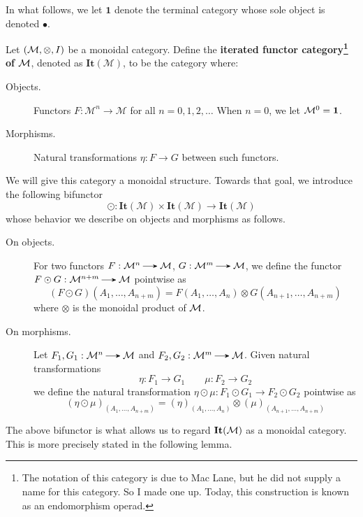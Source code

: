 In what follows, we let $\textbf{1}$ denote the terminal category 
whose sole object is denoted $\bullet$.
\begin{definition}
    Let $(\mathcal{M}, \otimes, I)$ be a monoidal category. 
    Define the \textbf{iterated functor category\footnote{The notation of this category 
    is due to Mac Lane, but he did not supply a name for this category.
    So I made one up. Today, this construction is known as an endomorphism 
    operad.} of $\mathcal{M}$}, denoted as
    $\textbf{It}(\mathcal{M})$, to be the category where:
    \begin{description}
        \item[Objects.] Functors $F: \mathcal{M}^n \to \mathcal{M}$ for all $n = 0, 1, 2, \dots$
        When $n = 0$, we let $\mathcal{M}^0 = \textbf{1}$.
        \item[Morphisms.] Natural transformations $\eta: F \to G$ between such functors.
    \end{description}
\end{definition}

We will give this category a monoidal structure.
Towards that goal, we introduce the following bifunctor
\[
    \odot : \textbf{It}(\mathcal{M})\times \textbf{It}(\mathcal{M}) \to 
    \textbf{It}(\mathcal{M})
\]
whose behavior we describe on objects and morphisms as follows. 
\begin{description}
    \item[On objects.] For two functors $F: \mm^n \to \mm$, $G: \mm^m \to \mm$, 
    we define the functor $F \odot G: \mm^{n+m} \to \mm$ pointwise as 
    \[
        (F \odot G)(A_1, \dots, A_{n+m})
        = 
        F(A_1, \dots, A_n) \otimes G(A_{n+1}, \dots, A_{n+m})
    \]
    where $\otimes$ is the monoidal product of $\mathcal{M}$.
    \item[On morphisms.] 
    Let $F_1, G_1: \mm^n \to \mm$ and $F_2, G_2: \mm^m \to \mm$. 
    Given natural transformations 
    \[
        \eta: F_1 \to G_1 \qquad \mu: F_2 \to G_2
    \]
    we define the natural transformation $\eta \odot \mu: F_1 \odot G_1 \to F_2 \odot G_2$ 
    pointwise as
    \[
        (\eta \odot \mu)_{(A_1, \dots, A_{n+m})} = (\eta)_{(A_1, \dots, A_n)} \otimes (\mu)_{(A_{n+1}, \dots, A_{n+m})}
    \]
\end{description}

The above bifunctor is what allows us to regard $\textbf{It}(\mathcal{M})$ as a monoidal 
category. This is more precisely stated in the following lemma.

